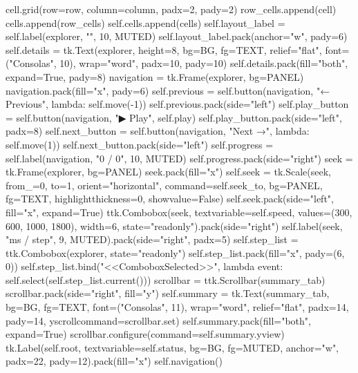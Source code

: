 \begin{lightcode}[numbers=left,firstnumber=1]
                    cell.grid(row=row, column=column, padx=2, pady=2)
                    row_cells.append(cell)
                cells.append(row_cells)
            self.cells.append(cells)
        self.layout_label = self.label(explorer, "", 10, MUTED)
        self.layout_label.pack(anchor="w", pady=6)
        self.details = tk.Text(explorer, height=8, bg=BG, fg=TEXT, relief="flat", font=("Consolas", 10), wrap="word", padx=10, pady=10)
        self.details.pack(fill="both", expand=True, pady=8)
        navigation = tk.Frame(explorer, bg=PANEL)
        navigation.pack(fill="x", pady=6)
        self.previous = self.button(navigation, "← Previous", lambda: self.move(-1))
        self.previous.pack(side="left")
        self.play_button = self.button(navigation, "▶ Play", self.play)
        self.play_button.pack(side="left", padx=8)
        self.next_button = self.button(navigation, "Next →", lambda: self.move(1))
        self.next_button.pack(side="left")
        self.progress = self.label(navigation, "0 / 0", 10, MUTED)
        self.progress.pack(side="right")
        seek = tk.Frame(explorer, bg=PANEL)
        seek.pack(fill="x")
        self.seek = tk.Scale(seek, from_=0, to=1, orient="horizontal", command=self.seek_to, bg=PANEL, fg=TEXT, highlightthickness=0, showvalue=False)
        self.seek.pack(side="left", fill="x", expand=True)
        ttk.Combobox(seek, textvariable=self.speed, values=(300, 600, 1000, 1800), width=6, state="readonly").pack(side="right")
        self.label(seek, "ms / step", 9, MUTED).pack(side="right", padx=5)
        self.step_list = ttk.Combobox(explorer, state="readonly")
        self.step_list.pack(fill="x", pady=(6, 0))
        self.step_list.bind("<<ComboboxSelected>>", lambda event: self.select(self.step_list.current()))
        scrollbar = ttk.Scrollbar(summary_tab)
        scrollbar.pack(side="right", fill="y")
        self.summary = tk.Text(summary_tab, bg=BG, fg=TEXT, font=("Consolas", 11), wrap="word", relief="flat", padx=14, pady=14, yscrollcommand=scrollbar.set)
        self.summary.pack(fill="both", expand=True)
        scrollbar.configure(command=self.summary.yview)
        tk.Label(self.root, textvariable=self.status, bg=BG, fg=MUTED, anchor="w", padx=22, pady=12).pack(fill="x")
        self.navigation()


\end{lightcode}
